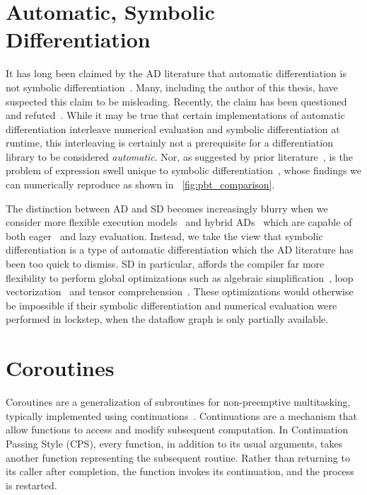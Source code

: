 \documentclass[12pt,initial,twoside,maitrise]{dms}
\numberwithin{equation}{section}
\numberwithin{table}{chapter}
\numberwithin{figure}{chapter}
\begin{document}
\section{Automatic, Symbolic Differentiation}

It has long been claimed by the AD literature that automatic differentiation is not symbolic differentiation~\citep{baydin2015survey}. Many, including the author of this thesis, have suspected this claim to be misleading. Recently, the claim has been questioned~\citep{wang2018demystifying} and refuted~\citep{laue2019equivalence}. While it may be true that certain implementations of automatic differentiation interleave numerical evaluation and symbolic differentiation at runtime, this interleaving is certainly not a prerequisite for a differentiation library to be considered \textit{automatic}. Nor, as suggested by prior literature~\citep{baydin2014ad}, is the problem of expression swell unique to symbolic differentiation~\citep{laue2019equivalence}, whose findings we can numerically reproduce as shown in ~\autoref{fig:pbt_comparison}.

The distinction between AD and SD becomes increasingly blurry when we consider more flexible execution models~\citep{wang2018demystifying} and hybrid ADs~\citep{abadi2016tensorflow} which are capable of both eager~\citep{agrawal2019tensorflow} and lazy evaluation. Instead, we take the view that symbolic differentiation is a type of automatic differentiation which the AD literature has been too quick to dismiss. SD in particular, affords the compiler far more flexibility to perform global optimizations such as algebraic simplification~\citep{bergstra2010theano}, loop vectorization~\citep{agarwal2019static} and tensor comprehension~\citep{vasilache2018tensor}. These optimizations would otherwise be impossible if their symbolic differentiation and numerical evaluation were performed in lockstep, when the dataflow graph is only partially available.

\section{Coroutines}\label{sec:coroutines}

Coroutines are a generalization of subroutines for non-preemptive multitasking, typically implemented using continuations~\citep{haynes1984continuations}. Continuations are a mechanism that allow functions to access and modify subsequent computation. In Continuation Passing Style \citep{sussman1975scheme} (CPS), every function, in addition to its usual arguments, takes another function representing the subsequent routine. Rather than returning to its caller after completion, the function invokes its continuation, and the process is restarted.
\end{document}
